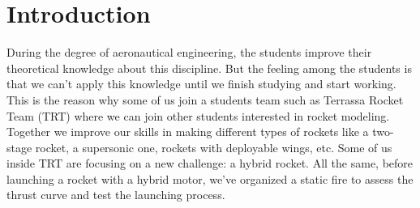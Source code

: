 
\section*{Introduction}

During the degree of aeronautical engineering, the students improve their theoretical knowledge about this discipline. But the feeling among the students is that we can’t apply this knowledge until we finish studying and start working. This is the reason why some of us join a students team such as Terrassa Rocket Team (TRT) where we can join other students interested in rocket modeling. Together we improve our skills in making different types of rockets like a two-stage rocket, a supersonic one, rockets with deployable wings, etc. Some of us inside TRT are focusing on a new challenge: a hybrid rocket.
All the same, before launching a rocket with a hybrid motor, we've organized a static fire to assess the thrust curve and test the launching process.
